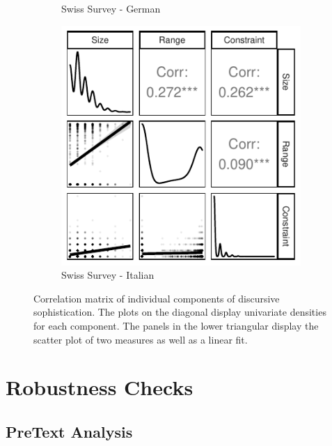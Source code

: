 \documentclass[12pt]{article}
\begin{document}
\begin{figure}[h]
\begin{subfigure}[h]{0.27\textwidth}
		\caption{Swiss Survey - German}
	\end{subfigure}%
	\begin{subfigure}[h]{0.27\textwidth}
		\centering
		\includegraphics[width=\textwidth]{../out/appB4h-italian_components.pdf}
		\caption{Swiss Survey - Italian}
	\end{subfigure}
	\caption[Correlation matrix of individual components of discursive sophistication.]{Correlation matrix of individual components of discursive sophistication. The plots on the diagonal display univariate densities for each component. The panels in the lower triangular display the scatter plot of two measures as well as a linear fit.%
	}\label{fig:components}
\end{figure}



\clearpage
\section{Robustness Checks}\label{app:robustness}

\subsection{PreText Analysis}\label{app:topicmodel}
\end{document}
